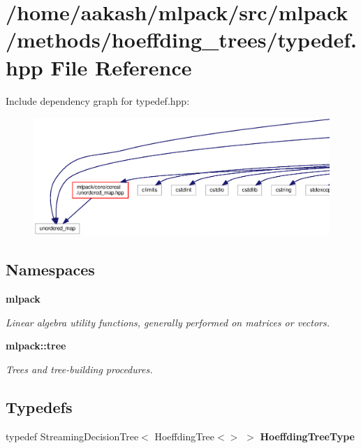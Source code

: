 \section{/home/aakash/mlpack/src/mlpack/methods/hoeffding\+\_\+trees/typedef.hpp File Reference}
\label{methods_2hoeffding__trees_2typedef_8hpp}
Include dependency graph for typedef.\+hpp\+:
\nopagebreak
\begin{figure}[H]
\begin{center}
\leavevmode
\includegraphics[width=350pt]{methods_2hoeffding__trees_2typedef_8hpp__incl}
\end{center}
\end{figure}
\subsection*{Namespaces}
\begin{DoxyCompactItemize}
\item 
 \textbf{ mlpack}
\begin{DoxyCompactList}\small\item\em Linear algebra utility functions, generally performed on matrices or vectors. \end{DoxyCompactList}\item 
 \textbf{ mlpack\+::tree}
\begin{DoxyCompactList}\small\item\em Trees and tree-\/building procedures. \end{DoxyCompactList}\end{DoxyCompactItemize}
\subsection*{Typedefs}
\begin{DoxyCompactItemize}
\item 
typedef Streaming\+Decision\+Tree$<$ Hoeffding\+Tree$<$$>$ $>$ \textbf{ Hoeffding\+Tree\+Type}
\end{DoxyCompactItemize}


